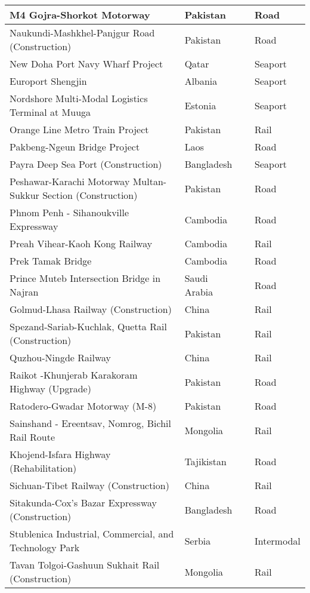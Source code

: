 \documentclass{article}
\begin{document}
\begin{center}
\begin{landscape}
\begin{longtable}{p{10cm}p{5cm}p{2cm}p{2cm}}
M4 Gojra-Shorkot Motorway	&	Pakistan	&		&	Road	\\	\hline
Naukundi-Mashkhel-Panjgur Road (Construction)	&	Pakistan	&		&	Road	\\	\hline
New Doha Port Navy Wharf Project	&	Qatar	&		&	Seaport	\\	\hline
Europort Shengjin	&	Albania	&		&	Seaport	\\	\hline
Nordshore Multi-Modal Logistics Terminal at Muuga	&	Estonia	&		&	Seaport	\\	\hline
Orange Line Metro Train Project	&	Pakistan	&		&	Rail	\\	\hline
Pakbeng-Ngeun Bridge Project	&	Laos	&		&	Road	\\	\hline
Payra Deep Sea Port (Construction)	&	Bangladesh	&		&	Seaport	\\	\hline
Peshawar-Karachi Motorway Multan-Sukkur Section (Construction)	&	Pakistan	&		&	Road	\\	\hline
Phnom Penh - Sihanoukville Expressway	&	Cambodia	&		&	Road	\\	\hline
Preah Vihear-Kaoh Kong Railway	&	Cambodia	&		&	Rail	\\	\hline
Prek Tamak Bridge	&	Cambodia	&		&	Road	\\	\hline
Prince Muteb Intersection Bridge in Najran	&	Saudi Arabia	&		&	Road	\\	\hline
Golmud-Lhasa Railway (Construction)	&	China	&		&	Rail	\\	\hline
Spezand-Sariab-Kuchlak, Quetta Rail (Construction)	&	Pakistan	&		&	Rail	\\	\hline
Quzhou-Ningde Railway	&	China	&		&	Rail	\\	\hline
Raikot -Khunjerab Karakoram Highway (Upgrade)	&	Pakistan	&		&	Road	\\	\hline
Ratodero-Gwadar Motorway (M-8)	&	Pakistan	&		&	Road	\\	\hline
Sainshand - Ereentsav, Nomrog, Bichil Rail Route	&	Mongolia	&		&	Rail	\\	\hline
Khojend-Isfara Highway (Rehabilitation)	&	Tajikistan	&		&	Road	\\	\hline
Sichuan-Tibet Railway (Construction)	&	China	&		&	Rail	\\	\hline
Sitakunda-Cox's Bazar Expressway (Construction)	&	Bangladesh	&		&	Road	\\	\hline
Stublenica Industrial, Commercial, and Technology Park	&	Serbia	&		&	Intermodal	\\	\hline
Tavan Tolgoi-Gashuun Sukhait Rail (Construction)	&	Mongolia	&		&	Rail	\\	\hline

\end{longtable}
\end{landscape}
\end{center}
\end{document}

